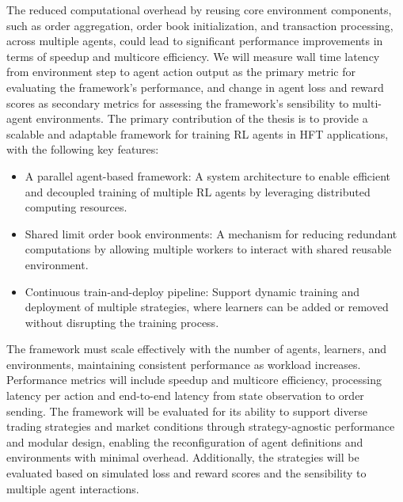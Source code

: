 The reduced computational overhead by reusing core environment components, such as order aggregation, order book initialization,
and transaction processing, across multiple agents, could lead to significant performance improvements in terms of speedup and multicore efficiency.
We will measure wall time latency from environment step to agent action output as the primary metric for evaluating the framework's performance,
and change in agent loss and reward scores as secondary metrics for assessing the framework's sensibility to multi-agent environments.
The primary contribution of the thesis is to provide a scalable
and adaptable framework for training RL agents in HFT applications, with the following key features:

\begin{itemize}
    \item A parallel agent-based framework: A system architecture to enable efficient and decoupled training of multiple RL agents
    by leveraging distributed computing resources.

    \item Shared limit order book environments: A mechanism for reducing redundant computations by allowing multiple workers
    to interact with shared reusable environment.

    \item Continuous train-and-deploy pipeline: Support dynamic training and deployment of multiple strategies,
    where learners can be added or removed without disrupting the training process.
\end{itemize}

The framework must scale effectively with the number of agents, learners, and environments, maintaining consistent performance as workload increases.
Performance metrics will include speedup and multicore efficiency, processing latency per action and end-to-end latency from state observation to order sending.
The framework will be evaluated for its ability to support diverse trading strategies
and market conditions through strategy-agnostic performance and modular design,
enabling the reconfiguration of agent definitions and environments with minimal overhead.
Additionally, the strategies will be evaluated based on simulated loss and reward scores and the sensibility to multiple agent interactions.

